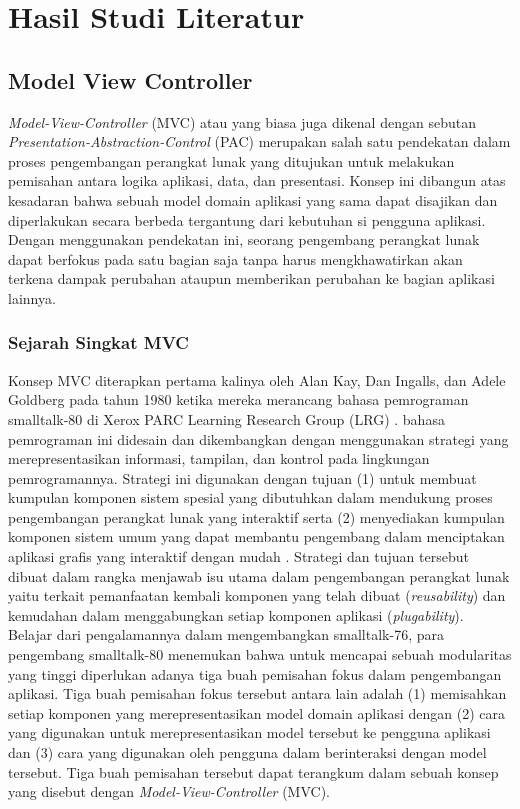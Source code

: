 \chapter{Hasil Studi Literatur}

\section{Model View Controller}
\noindent
\textit{Model-View-Controller} (MVC) atau yang biasa juga dikenal dengan sebutan \textit{Presentation-Abstraction-Control} (PAC) merupakan salah satu pendekatan dalam proses pengembangan perangkat lunak yang ditujukan untuk melakukan pemisahan antara logika aplikasi, data, dan presentasi. Konsep ini dibangun atas kesadaran bahwa sebuah model domain aplikasi yang sama dapat disajikan dan diperlakukan secara berbeda tergantung dari kebutuhan si pengguna aplikasi. Dengan menggunakan pendekatan ini, seorang pengembang perangkat lunak dapat berfokus pada satu bagian saja tanpa harus mengkhawatirkan akan terkena dampak perubahan ataupun memberikan perubahan ke bagian aplikasi lainnya.

\subsection{Sejarah Singkat MVC}
\noindent
Konsep MVC diterapkan pertama kalinya oleh Alan Kay, Dan Ingalls, dan Adele Goldberg pada tahun 1980 ketika mereka merancang bahasa pemrograman smalltalk-80 di Xerox PARC Learning Research Group (LRG) \citep{krasner1988desc}. bahasa pemrograman ini didesain dan dikembangkan dengan menggunakan strategi yang merepresentasikan informasi, tampilan, dan kontrol pada lingkungan pemrogramannya. Strategi ini digunakan dengan tujuan (1) untuk membuat kumpulan komponen sistem spesial yang dibutuhkan dalam mendukung proses pengembangan perangkat lunak yang interaktif serta (2) menyediakan kumpulan komponen sistem umum yang dapat membantu pengembang dalam menciptakan aplikasi grafis yang interaktif dengan mudah \citep{krasner1988desc}. Strategi dan tujuan tersebut dibuat dalam rangka menjawab isu utama dalam pengembangan perangkat lunak yaitu terkait pemanfaatan kembali komponen yang telah dibuat (\textit{reusability}) dan kemudahan dalam menggabungkan setiap komponen aplikasi (\textit{plugability}). \\

\noindent
Belajar dari pengalamannya dalam mengembangkan smalltalk-76, para pengembang smalltalk-80 menemukan bahwa untuk mencapai sebuah modularitas yang tinggi diperlukan adanya tiga buah pemisahan fokus dalam pengembangan aplikasi. Tiga buah pemisahan fokus tersebut antara lain adalah (1) memisahkan setiap komponen yang merepresentasikan model domain aplikasi dengan (2) cara yang digunakan untuk merepresentasikan model tersebut ke pengguna aplikasi dan (3) cara yang digunakan oleh pengguna dalam berinteraksi dengan model tersebut. Tiga buah pemisahan tersebut dapat terangkum dalam sebuah konsep yang disebut dengan \textit{Model-View-Controller} (MVC).

